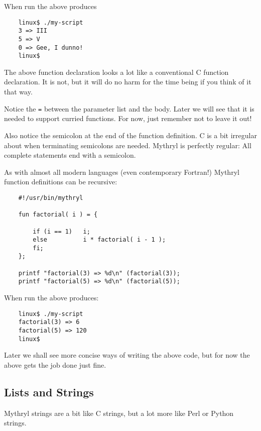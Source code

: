 When run the above produces

\begin{verbatim}
    linux$ ./my-script
    3 => III
    5 => V
    0 => Gee, I dunno!
    linux$
\end{verbatim}

The above function declaration looks a lot like a conventional C function 
declaration.  It is not, but it will do no harm for the time being if you 
think of it that way.

Notice the {\tt =} between the parameter list and 
the body.  Later we will see that it is needed to support curried functions. 
For now, just remember not to leave it out!

Also notice the semicolon at the end of the function definition.  C is a 
bit irregular about when terminating semicolons are needed.  Mythryl is 
perfectly regular:  All complete statements end with a semicolon.

As with almost all modern languages (even contemporary Fortran!)  
Mythryl function definitions can be recursive:

\begin{verbatim}
    #!/usr/bin/mythryl

    fun factorial( i ) = {

        if (i == 1)   i;
        else          i * factorial( i - 1 );
        fi;
    };

    printf "factorial(3) => %d\n" (factorial(3));
    printf "factorial(5) => %d\n" (factorial(5));
\end{verbatim}

When run the above produces:

\begin{verbatim}
    linux$ ./my-script
    factorial(3) => 6
    factorial(5) => 120
    linux$
\end{verbatim}

Later we shall see more concise ways of writing the above 
code, but for now the above gets the job done just fine.

\cutend*


\subsection{Lists and Strings}

Mythryl strings are a bit like C strings, but a lot more like Perl or 
Python strings.

